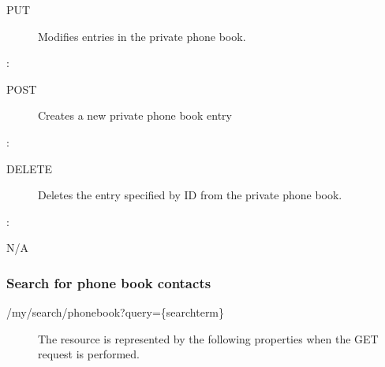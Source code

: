 \documentclass[letterpaper,10pt,english]{sphinxmanual}
\begin{document}
\begin{sphinxVerbatim}[commandchars=\\\{\}]
\end{sphinxVerbatim}
\begin{description}
\item[{ PUT}] \leavevmode
Modifies entries in the private phone book.

\end{description}

:

\begin{sphinxVerbatim}[commandchars=\\\{\}]
\end{sphinxVerbatim}
\begin{description}
\item[{ POST}] \leavevmode
Creates a new private phone book entry

\end{description}

:

\begin{sphinxVerbatim}[commandchars=\\\{\}]
\end{sphinxVerbatim}
\begin{description}
\item[{ DELETE}] \leavevmode
Deletes the entry specified by ID from the private phone book.

\end{description}

:

\begin{sphinxVerbatim}[commandchars=\\\{\}]
\end{sphinxVerbatim}

 N/A


\subsubsection{Search for phone book contacts}
\label{\detokenize{restapi:search-for-phone-book-contacts}}
 /my/search/phonebook?query=\{searchterm\}
\begin{description}
\item[{}] \leavevmode
The resource is represented by the following properties when the GET request is performed.

\end{description}
\end{document}
